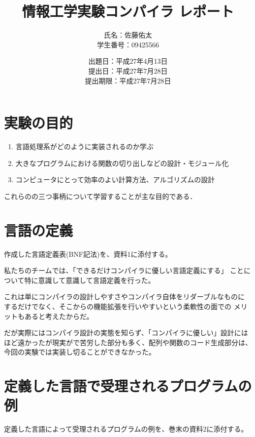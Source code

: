 \documentclass[11pt,a4j]{jarticle}
\title{情報工学実験コンパイラ レポート}
\author{氏名：佐藤佑太\\学生番号：09425566}
\date{出題日：平成27年4月13日\\提出日：平成27年7月28日\\提出期限：平成27年7月28日}
\begin{document}
\maketitle
\newpage



\section{実験の目的}

\begin{enumerate}
\item {言語処理系がどのように実装されるのか学ぶ}
\item {大きなプログラムにおける関数の切り出しなどの設計・モジュール化}
\item {コンピュータにとって効率のよい計算方法、アルゴリズムの設計}
\end{enumerate}
これらのの三つ事柄について学習することが主な目的である．




\section{言語の定義}

作成した言語定義表(BNF記法)を、資料1に添付する。

私たちのチームでは、「できるだけコンパイラに優しい言語定義にする」
ことについて特に意識して意識して言語定義を行った。

これは単にコンパイラの設計しやすさやコンパイラ自体をリダーブルなものに
するだけでなく、そこからの機能拡張を行いやすいという柔軟性の面での
メリットもあると考えたからだ。

だが実際にはコンパイラ設計の実態を知らず、「コンパイラに優しい」設計には
ほど遠かったが現実がで苦労した部分も多く、配列や関数のコード生成部分は、
今回の実験では実装し切ることができなかった。




\section{定義した言語で受理されるプログラムの例}


定義した言語によって受理されるプログラムの例を、巻末の資料2に添付する。
\end{document}
